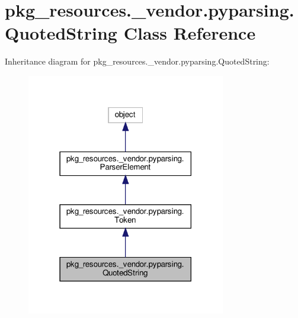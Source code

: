 \hypertarget{classpkg__resources_1_1__vendor_1_1pyparsing_1_1QuotedString}{}\section{pkg\+\_\+resources.\+\_\+vendor.\+pyparsing.\+Quoted\+String Class Reference}
\label{classpkg__resources_1_1__vendor_1_1pyparsing_1_1QuotedString}


Inheritance diagram for pkg\+\_\+resources.\+\_\+vendor.\+pyparsing.\+Quoted\+String\+:
\nopagebreak
\begin{figure}[H]
\begin{center}
\leavevmode
\includegraphics[width=246pt]{classpkg__resources_1_1__vendor_1_1pyparsing_1_1QuotedString__inherit__graph}
\end{center}
\end{figure}


